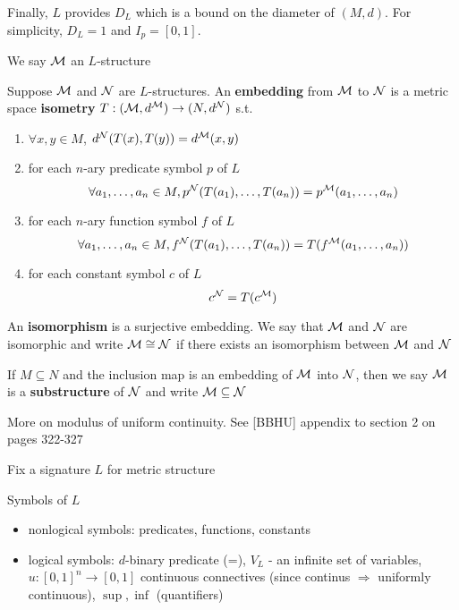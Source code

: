 \documentclass[11pt]{article}
\begin{document}
Finally, \(L\) provides \(D_L\) which is a bound on the diameter of \((M,d)\). For
simplicity, \(D_L=1\) and \(I_p=[0,1]\).

We say \(\mathcal{M}\) an \(L\)-structure

Suppose \(\mathcal{M}\) and \(\mathcal{N}\) are \(L\)-structures. An \textbf{embedding} from \(\mathcal{M}\) to \(\mathcal{N}\) is
a metric space \textbf{isometry} \(T:(\mathcal{M},d^{\mathcal{M}})\to(N,d^{\mathcal{N}})\) s.t.
\begin{enumerate}
\item \(\forall x,y\in M\), \(d^{\mathcal{N}}(T(x),T(y))=d^{\mathcal{M}}(x,y)\)
\item for each \(n\)-ary predicate symbol \(p\) of \(L\)
\begin{equation*}
\forall a_1,\dots,a_n\in M,p^{\mathcal{N}}(T(a_1),\dots,T(a_n))=p^{\mathcal{M}}(a_1,\dots,a_n)
\end{equation*}
\item for each \(n\)-ary function symbol \(f\) of  \(L\)
\begin{equation*}
\forall a_1,\dots,a_n\in M,f^{\mathcal{N}}(T(a_1),\dots,T(a_n))=T(f^{\mathcal{M}}(a_1,\dots,a_n))
\end{equation*}
\item for each constant symbol \(c\) of \(L\)
\begin{equation*}
c^{\mathcal{N}}=T(c^{\mathcal{M}})
\end{equation*}
\end{enumerate}


An \textbf{isomorphism} is a surjective embedding. We say that \(\mathcal{M}\) and \(\mathcal{N}\) are isomorphic and
write \(\mathcal{M}\cong\mathcal{N}\) if there exists an isomorphism between \(\mathcal{M}\) and \(\mathcal{N}\)

If \(M\subseteq N\) and the inclusion map is an embedding of \(\mathcal{M}\) into \(\mathcal{N}\), then we
say \(\mathcal{M}\) is a \textbf{substructure} of \(\mathcal{N}\) and write \(\mathcal{M}\subseteq\mathcal{N}\)

More on modulus of uniform continuity. See [BBHU] appendix to section 2 on pages 322-327

Fix a signature \(L\) for metric structure

Symbols of \(L\)
\begin{itemize}
\item nonlogical symbols: predicates, functions, constants
\item logical symbols: \(d\)-binary predicate (=), \(V_L\) - an infinite set of
variables, \(u:[0,1]^n\to[0,1]\) continuous connectives (since continus \(\Rightarrow\)
uniformly continuous), \(\sup,\inf\) (quantifiers)
\end{itemize}
\end{document}
